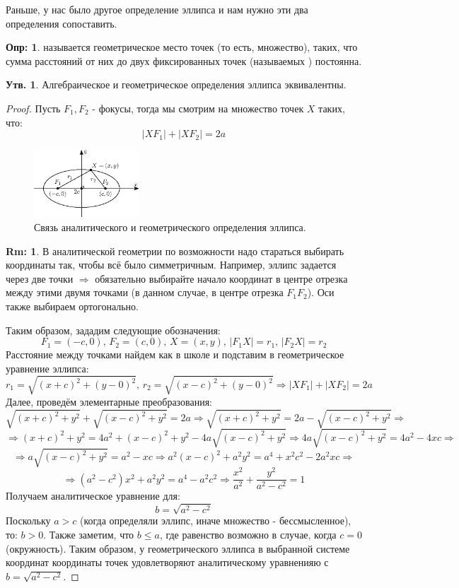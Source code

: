 \documentclass[12pt]{article}
\theoremstyle{definition}
\newtheorem{defn}{Опр:}
\newtheorem{rem}{Rm:}
\newtheorem{prop}{Утв.}
\begin{document}
Раньше, у нас было другое определение эллипса и нам нужно эти два определения сопоставить.
\begin{defn}
	 называется геометрическое место точек (то есть, множество), таких, что сумма расстояний от них до двух фиксированных точек (называемых ) постоянна.
\end{defn}
\begin{prop}
	Алгебраическое и геометрическое определения эллипса эквивалентны.
\end{prop}
\begin{proof}
	Пусть $F_1, F_2$ - фокусы, тогда мы смотрим на множество точек $X$ таких, что:
	$$
		|XF_1| + |XF_2| = 2a
	$$
	\begin{figure}[H]
		\centering
		\includegraphics[width=0.35\textwidth]{ANGL2_24.eps}
		\caption{Связь аналитического и геометрического определения эллипса.}
		\label{2_24}
	\end{figure}
	\begin{rem}
		В аналитической геометрии по возможности надо стараться выбирать координаты так, чтобы всё было симметричным. Например, эллипс задается через две точки $\Rightarrow$ обязательно выбирайте начало координат в центре отрезка между этими двумя точками (в данном случае, в центре отрезка $F_1F_2$). Оси также выбираем ортогонально.
	\end{rem}
	Таким образом, зададим следующие обозначения:
	$$
		F_1 = (-c,0), \, F_2 = (c, 0), \, X = (x,y), \, |F_1 X| = r_1, \, |F_2 X| = r_2
	$$
	Расстояние между точками найдем как в школе и подставим в геометрическое уравнение эллипса:
	$$
		r_1 = \sqrt{(x + c)^2 + (y - 0)^2}, \, r_2 = \sqrt{(x - c)^2 + (y - 0)^2} \Rightarrow |XF_1| + |XF_2| = 2a
	$$
	Далее, проведём элементарные преобразования:
	$$
		\sqrt{(x + c)^2 + y^2} + \sqrt{(x - c)^2 + y^2} = 2a \Rightarrow \sqrt{(x + c)^2 + y^2}   = 2a - \sqrt{(x - c)^2 + y^2} \Rightarrow
	$$
	$$
		\Rightarrow (x+c)^2 + y^2 = 4a^2 + (x-c)^2 + y^2 - 4a\sqrt{(x - c)^2 + y^2} \Rightarrow 4a\sqrt{(x - c)^2 + y^2} = 4a^2 - 4xc \Rightarrow
	$$
	$$
		\Rightarrow a\sqrt{(x - c)^2 + y^2} = a^2 - xc \Rightarrow a^2(x-c)^2 +a^2y^2 = a^4 + x^2c^2 - 2a^2xc \Rightarrow
	$$
	$$
		\Rightarrow (a^2 - c^2)x^2 + a^2y^2 = a^4 - a^2c^2 \Rightarrow \dfrac{x^2}{a^2} + \dfrac{y^2}{a^2 - c^2} = 1 
	$$
	Получаем аналитическое уравнение для: 
	$$
		b = \sqrt{a^2 - c^2}
	$$ 
	Поскольку $a > c$ (когда определяли эллипс, иначе множество - бессмысленное), то: $b > 0$. Также заметим, что $b \leq a$, где равенство возможно в случае, когда $c = 0$ (окружность). Таким образом, у геометрического эллипса в выбранной системе координат координаты точек удовлетворяют аналитическому уравненияю с $b = \sqrt{a^2 - c^2}$.
	

\end{proof}
\end{document}
